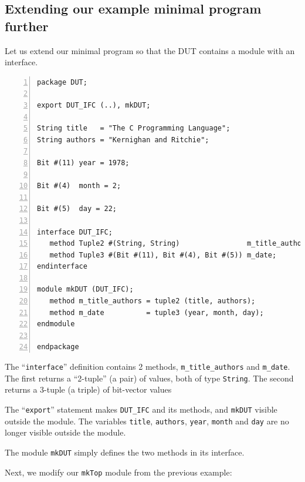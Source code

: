 
\subsection{Extending our example minimal {\BSV} program further}

\label{Sec_Module_and_Interface}

Let us extend our minimal {\BSV} program so that the DUT contains a
module with an interface.

{\footnotesize
\begin{Verbatim}[frame=single, numbers=left, label=in file Ex\_04\_04/DUT.bsv]
package DUT;

export DUT_IFC (..), mkDUT;

String title   = "The C Programming Language";
String authors = "Kernighan and Ritchie";

Bit #(11) year = 1978;

Bit #(4)  month = 2;

Bit #(5)  day = 22;

interface DUT_IFC;
   method Tuple2 #(String, String)                m_title_authors;
   method Tuple3 #(Bit #(11), Bit #(4), Bit #(5)) m_date;
endinterface

module mkDUT (DUT_IFC);
   method m_title_authors = tuple2 (title, authors);
   method m_date          = tuple3 (year, month, day);
endmodule

endpackage
\end{Verbatim}
}

The ``\verb|interface|'' definition contains 2 methods,
\verb|m_title_authors| and \verb|m_date|.  The first returns a
``2-tuple'' (a pair) of values, both of type \verb|String|.  The
second returns a 3-tuple (a triple) of bit-vector values

The ``\verb|export|'' statement makes \verb|DUT_IFC| and its methods,
and \verb|mkDUT| visible outside the module.  The variables
\verb|title|, \verb|authors|, \verb|year|, \verb|month| and \verb|day|
are no longer visible outside the module.

The module \verb|mkDUT| simply defines the two methods in its interface.

Next, we modify our \verb|mkTop| module from the previous example:

